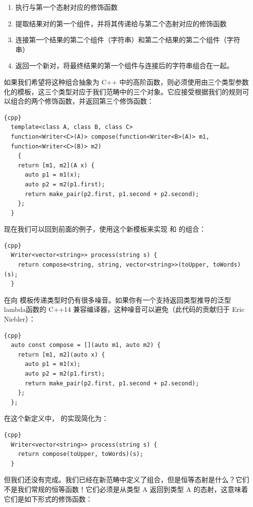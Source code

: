 \begin{enumerate}
  \tightlist
  \item
  执行与第一个态射对应的修饰函数
  \item
  提取结果对的第一个组件，并将其传递给与第二个态射对应的修饰函数
  \item
  连接第一个结果的第二个组件（字符串）和第二个结果的第二个组件（字符串）
  \item
  返回一个新对，将最终结果的第一个组件与连接后的字符串组合在一起。
\end{enumerate}

如果我们希望将这种组合抽象为 C++ 中的高阶函数，则必须使用由三个类型参数化的模板，这三个类型对应于我们范畴中的三个对象。它应接受根据我们的规则可以组合的两个修饰函数，并返回第三个修饰函数：

\begin{lstlisting}{cpp}
  template<class A, class B, class C>
  function<Writer<C>(A)> compose(function<Writer<B>(A)> m1,
  function<Writer<C>(B)> m2)
    {
    return [m1, m2](A x) {
      auto p1 = m1(x);
      auto p2 = m2(p1.first);
      return make_pair(p2.first, p1.second + p2.second);
    };
  }
\end{lstlisting}
现在我们可以回到前面的例子，使用这个新模板来实现  和  的组合：

\begin{lstlisting}{cpp}
  Writer<vector<string>> process(string s) {
    return compose<string, string, vector<string>>(toUpper, toWords)(s);
  }
\end{lstlisting}
在向  模板传递类型时仍有很多噪音。如果你有一个支持返回类型推导的泛型lambda函数的 C++14 兼容编译器，这种噪音可以避免（此代码的贡献归于 Eric Niebler）：

\begin{lstlisting}{cpp}
  auto const compose = [](auto m1, auto m2) {
    return [m1, m2](auto x) {
      auto p1 = m1(x);
      auto p2 = m2(p1.first);
      return make_pair(p2.first, p1.second + p2.second);
    };
  };
\end{lstlisting}
在这个新定义中， 的实现简化为：

\begin{lstlisting}{cpp}
  Writer<vector<string>> process(string s) {
    return compose(toUpper, toWords)(s);
  }
\end{lstlisting}
但我们还没有完成。我们已经在新范畴中定义了组合，但是恒等态射是什么？它们不是我们常规的恒等函数！它们必须是从类型 A 返回到类型 A 的态射，这意味着它们是如下形式的修饰函数：


